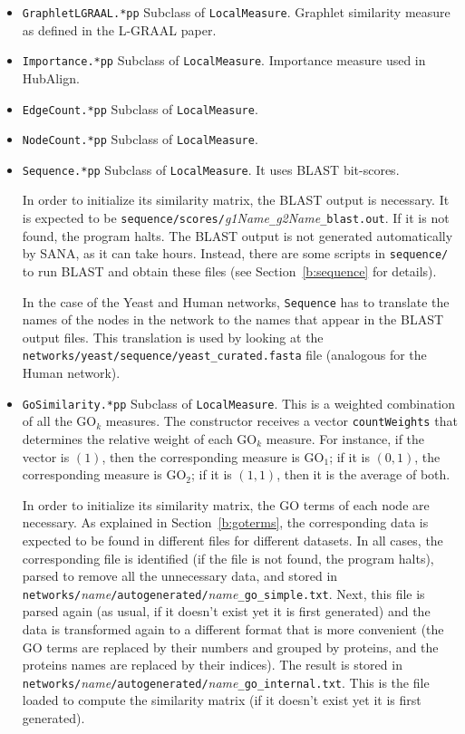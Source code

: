 \documentclass[]{article}
\begin{document}
\begin{itemize}
\item \texttt{GraphletLGRAAL.*pp} Subclass of \texttt{LocalMeasure}. Graphlet similarity measure as defined in the L-GRAAL paper.

\item \texttt{Importance.*pp} Subclass of \texttt{LocalMeasure}. Importance measure used in HubAlign.

\item \texttt{EdgeCount.*pp} Subclass of \texttt{LocalMeasure}.

\item \texttt{NodeCount.*pp} Subclass of \texttt{LocalMeasure}.

\item \texttt{Sequence.*pp} Subclass of \texttt{LocalMeasure}. It uses BLAST bit-scores.

In order to initialize its similarity matrix, the BLAST output is necessary. It is expected to be \texttt{sequence/scores/}\textit{g1Name}\texttt{\_}\textit{g2Name}\texttt{\_blast.out}. If it is not found, the program halts. The BLAST output is not generated automatically by SANA, as it can take hours. Instead, there are some scripts in \texttt{sequence/} to run BLAST and obtain these files (see Section~\ref{b:sequence} for details).

In the case of the Yeast and Human networks, \texttt{Sequence} has to translate the names of the nodes in the network to the names that appear in the BLAST output files. This translation is used by looking at the \texttt{networks/yeast/sequence/yeast\_curated.fasta} file (analogous for the Human network).

\item \texttt{GoSimilarity.*pp} Subclass of \texttt{LocalMeasure}. This is a weighted combination of all the $\mbox{GO}_k$ measures. The constructor receives a vector \texttt{countWeights} that determines the relative weight of each $\mbox{GO}_k$ measure. For instance, if the vector is $(1)$, then the corresponding measure is $\mbox{GO}_1$; if it is $(0,1)$, the corresponding measure is $\mbox{GO}_2$; if it is $(1,1)$, then it is the average of both.

In order to initialize its similarity matrix, the GO terms of each node are necessary. As explained in Section~\ref{b:goterms}, the corresponding data is expected to be found in different files for different datasets. In all cases, the corresponding file is identified (if the file is not found, the program halts), parsed to remove all the unnecessary data, and stored in\\ \texttt{networks/}\textit{name}\texttt{/autogenerated/}\textit{name}\texttt{\_go\_simple.txt}. Next, this file is parsed again (as usual, if it doesn't exist yet it is first generated) and the data is transformed again to a different format that is more convenient (the GO terms are replaced by their numbers and grouped by proteins, and the proteins names are replaced by their indices). The result is stored in \texttt{networks/}\textit{name}\texttt{/autogenerated/}\textit{name}\texttt{\_go\_internal.txt}. This is the file loaded to compute the similarity matrix (if it doesn't exist yet it is first generated).


\end{itemize}
\end{document}
